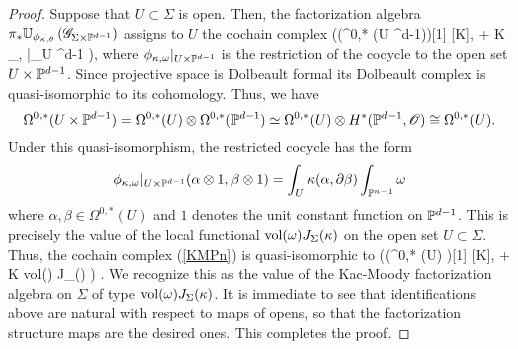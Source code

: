 \begin{proof}
Suppose that $U \subset \Sigma$ is open. 
Then, the factorization algebra $\pi_* \mathbb U_{\phi_{\kappa, \theta}} \left(\mathscr G_{\Sigma \times \mathbb P^{d-1}}\right)$ assigns to $U$ the cochain complex
\beqn\label{KMPn}
\left(\Sym \left(\Omega^{0,*} (U \times \PP^{d-1})\right)[1] [K], \dbar + K \phi_{\kappa, \omega}|_{U \times \PP^{d-1}} \right),
\eeqn
where $\phi_{\kappa, \omega}|_{U \times \mathbb P^{d-1}}$ is the restriction of the cocycle to the open set $U \times \mathbb P^{d-1}$. 
Since projective space is Dolbeault formal its Dolbeault complex is quasi-isomorphic to its cohomology.
Thus, we have
\[
\Omega^{0,*} (U \times \mathbb P^{d-1}) = \Omega^{0,*}(U) \otimes \Omega^{0,*}(\mathbb P^{d-1}) \simeq \Omega^{0,*}(U) \otimes H^*(\mathbb P^{d-1}, \mathscr O) \cong \Omega^{0,*}(U) .
\]
Under this quasi-isomorphism, the restricted cocycle has the form
\[
\phi_{\kappa,\omega}|_{U \times \mathbb P^{d-1}} (\alpha \otimes 1, \beta \otimes 1) = \int_{U} \kappa(\alpha, \partial \beta) \int_{\mathbb P^{n-1}} \omega 
\]
where $\alpha,\beta \in \Omega^{0,*} (U)$ and $1$ denotes the unit constant function on $\mathbb P^{d-1}$. 
This is precisely the value of the local functional ${\rm vol}(\omega) J_\Sigma (\kappa)$ on the open set $U \subset \Sigma$. 
Thus, the cochain complex (\ref{KMPn}) is quasi-isomorphic to 
\beqn
\left(\Sym \left(\Omega^{0,*} (U) \right)[1] [K], \dbar + K {\rm vol}(\omega) J_\Sigma (\kappa) \right) .
\eeqn
We recognize this as the value of the Kac-Moody factorization algebra on $\Sigma$ of type ${\rm vol}(\omega) J_\Sigma (\kappa)$.
It is immediate to see that identifications above are natural with respect to maps of opens, so that the factorization structure maps are the desired ones. 
This completes the proof.
\end{proof}

